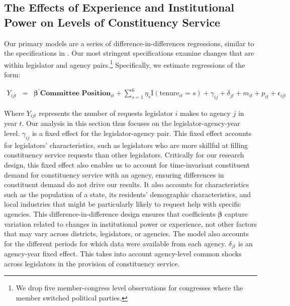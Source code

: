 \documentclass[12pt]{article}
\begin{document}
\subsection{The Effects of Experience and Institutional Power on Levels of Constituency Service}\label{s:prestige}

 Our primary models are a series of difference-in-differences regressions, similar to the specifications in \cite{BerryFowler2016}. Our most stringent specifications examine changes that are within legislator and agency pairs.\footnote{We drop five member-congress level observations for congresses where the member switched political parties.} Specifically, we estimate regressions of the form: 

\begin{eqnarray}
Y_{ijt} & = & \boldsymbol{\beta}^{'} \textbf{Committee Position}_{it}  + \sum_{s = 1}^{6} \eta_{s} \text{I}\left(\text{tenure}_{it} = s\right) + \gamma_{ij} + \delta_{jt} + m_{it} + p_{it} + \epsilon_{ijt} \label{e:diff1}
\end{eqnarray}

Where $Y_{ijt}$ represents the number of requests legislator $i$ makes to agency $j$ in year $t$. Our analysis in this section thus focuses on the legislator-agency-year level. $\gamma_{ij}$ is a fixed effect for the legislator-agency pair. This fixed effect accounts for legislators' characteristics, such as legislators who are more skillful at filling constituency service requests than other legislators. Critically for our research design, this fixed effect also enables us to account for time-invariant constituent demand for constituency service with an agency, ensuring differences in constituent demand do not drive our results. It also accounts for characteristics such as the population of a state, its residents' demographic characteristics, and local industries that might be particularly likely to request help with specific agencies. This difference-in-difference design ensures that coefficients $\boldsymbol{\beta}$ capture variation related to changes in institutional power or experience, not other factors that may vary across districts, legislators, or agencies. The model also accounts for the different periods for which data were available from each agency. $\delta_{jt}$ is an agency-year fixed effect. This takes into account agency-level common shocks across legislators in the provision of constituency service. 
\end{document}
